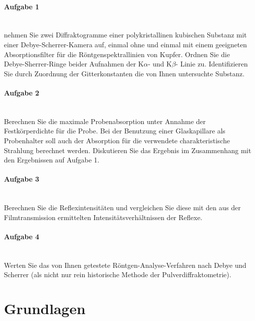 \documentclass[a4paper,twoside,final]{article}
\begin{document}
\paragraph{Aufgabe 1}$~$\\
nehmen Sie zwei Diffraktogramme einer polykristallinen kubischen Substanz mit einer Debye\--Scherrer\--Ka\-me\-ra auf, einmal ohne und einmal mit einem geeigneten Absorptionsfilter für die Röntgenspektrallinien von Kupfer. Ordnen Sie die Debye-Sherrer-Ringe beider Aufnahmen der K$\alpha$- und K$\beta$- Linie zu. Identifizieren Sie durch Zuordnung der Gitterkonstanten die von Ihnen untersuchte Substanz.
\paragraph{Aufgabe 2}$~$\\
Berechnen Sie die maximale Probenabsorption unter Annahme der Festkörperdichte für die Probe. Bei der Benutzung einer Glaskapillare als Probenhalter soll auch der Absorption für die verwendete charakteristische Strahlung berechnet werden. Diskutieren Sie das Ergebnis im Zusammenhang mit den Ergebnissen auf Aufgabe 1.
\paragraph{Aufgabe 3}$~$\\
Berechnen Sie die Reflexintensitäten und vergleichen Sie diese mit den aus der Filmtransmission ermittelten Intensitätsverhältnissen der Reflexe.
\paragraph{Aufgabe 4}$~$\\
Werten Sie das von Ihnen getestete Röntgen-Analyse-Verfahren nach Debye und Scherrer (als nicht nur rein \glqq historische\grqq{} Methode der Pulverdiffraktometrie).


\section{Grundlagen} \label{sec:Grundlagen}

\end{document}
